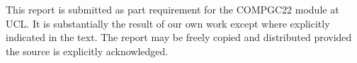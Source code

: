 \documentclass[fontsize=11pt]{extarticle}
\numberwithin{figure}{section} %
\numberwithin{table}{section}%
\begin{document}
\begin{titlepage}
{\footnotesize This report is submitted as part requirement for the COMPGC22 module at UCL. It is substantially the result of our own work except where explicitly indicated in the text. The report may be freely copied and distributed provided the source is explicitly acknowledged.}

\vfill %
\end{titlepage}


\newpage


\renewcommand{\abstractname}{Executive Summary}
\end{document}
